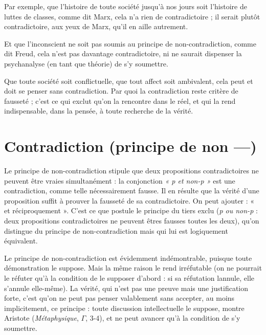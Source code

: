 Par exemple, que l’histoire de toute société jusqu’à nos jours soit l’histoire
de luttes de classes, comme dit Marx, cela n’a rien de contradictoire ; il serait
plutôt contradictoire, aux yeux de Marx, qu’il en aille autrement.

Et que l'inconscient ne soit pas soumis au principe de non-contradiction,
comme dit Freud, cela n’est pas davantage contradictoire, ni ne saurait dispenser
la psychanalyse (en tant que théorie) de s’y soumettre.

Que toute société soit conflictuelle, que tout affect soit ambivalent, cela
peut et doit se penser sans contradiction. Par quoi la contradiction reste critère
de fausseté ; c’est ce qui exclut qu’on la rencontre dans le réel, et qui la rend
indispensable, dans la pensée, à toute recherche de la vérité.

\section{Contradiction (principe de non —)}
Le principe de non-contradiction stipule que
deux propositions contradictoires ne peuvent être vraies simultanément : la conjonction
{\it « p et non-p »} est une contradiction, comme telle nécessairement fausse. Il en
résulte que la vérité d’une proposition suffit à prouver la fausseté de sa contradictoire.
On peut ajouter : « et réciproquement ». C’est ce que postule le principe
du tiers exclu ({\it p ou non-p} : deux propositions contradictoires ne peuvent
êtres fausses toutes les deux), qu’on distingue du principe de non-contradiction
mais qui lui est logiquement équivalent.

Le principe de non-contradiction est évidemment indémontrable, puisque
toute démonstration le suppose. Mais la même raison le rend irréfutable (on ne
pourrait le réfuter qu’à la condition de le supposer d’abord : si sa réfutation
lannule, elle s’annule elle-même). La vérité, qui n’est pas une preuve mais une
justification forte, c’est qu’on ne peut pas penser valablement sans accepter, au
moins implicitement, ce principe : toute discussion intellectuelle le suppose,
montre Aristote ({\it Métaphysique}, $\Gamma$, 3-4), et ne peut avancer qu’à la condition de
s’y soumettre.

